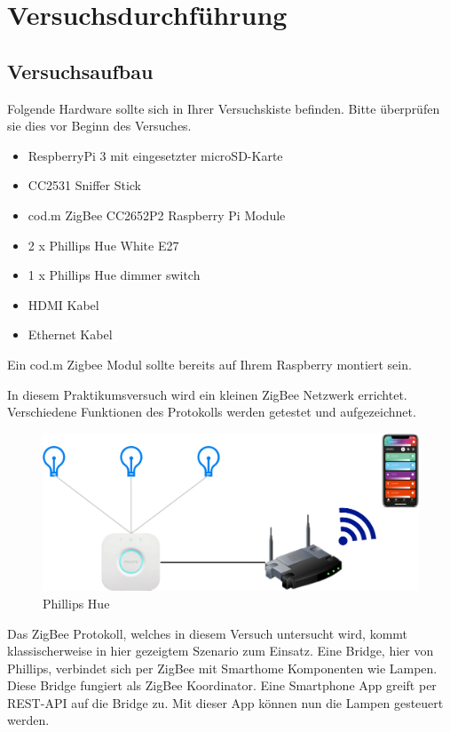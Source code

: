 \chapter{Versuchsdurchführung}

\section{Versuchsaufbau}

Folgende Hardware sollte sich in Ihrer Versuchskiste befinden. Bitte überprüfen sie dies vor Beginn des Versuches.

\begin{itemize}
    \item RespberryPi 3 mit eingesetzter microSD-Karte
    \item CC2531 Sniffer Stick
    \item cod.m ZigBee CC2652P2 Raspberry Pi Module
    \item 2 x Phillips Hue White E27
    \item 1 x Phillips Hue dimmer switch
    \item HDMI Kabel
    \item Ethernet Kabel
\end{itemize}

Ein cod.m Zigbee Modul sollte bereits auf Ihrem Raspberry montiert sein. 

In diesem Praktikumsversuch wird ein kleinen ZigBee Netzwerk errichtet. Verschiedene Funktionen des Protokolls werden getestet und aufgezeichnet.


\begin{figure}[H]
    \centering
    \includegraphics[width=1\textwidth]{media/zbhue.png}
    \caption{Phillips Hue}
\end{figure}
Das ZigBee Protokoll, welches in diesem Versuch untersucht wird, kommt klassischerweise in hier gezeigtem Szenario zum Einsatz.
Eine Bridge, hier von Phillips, verbindet sich per ZigBee mit Smarthome Komponenten wie Lampen. Diese Bridge fungiert als ZigBee Koordinator. 
Eine Smartphone App greift per REST-API auf die Bridge zu. Mit dieser App können nun die Lampen gesteuert werden.


